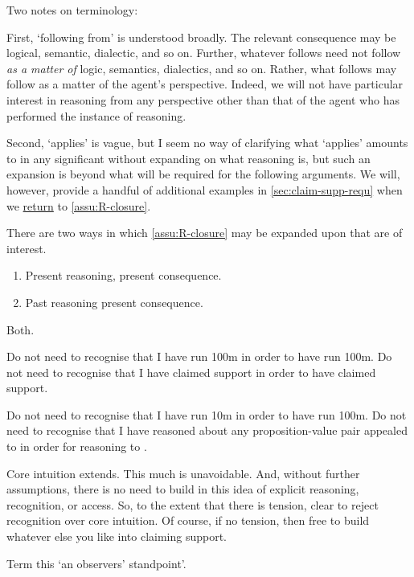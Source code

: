 \begin{note}
  Two notes on terminology:

  First, `following from' is understood broadly.
  The relevant consequence may be logical, semantic, dialectic, and so on.
  Further, whatever follows need not follow \emph{as a matter of} logic, semantics, dialectics, and so on.
  Rather, what follows may follow as a matter of the agent's perspective.
  Indeed, we will not have particular interest in reasoning from any perspective other than that of the agent who has performed the instance of reasoning.

  Second, `applies' is vague, but I seem no way of clarifying what `applies' amounts to in any significant without expanding on what reasoning is, but such an expansion is beyond what will be required for the following arguments.
  We will, however, provide a handful of additional examples in \autoref{sec:claim-supp-requ} when we \hyperref[independence-and-assu:R-closure]{return} to \autoref{assu:R-closure}.
\end{note}

\begin{note}
  There are two ways in which \autoref{assu:R-closure} may be expanded upon that are of interest.

  \begin{enumerate}
  \item Present reasoning, present consequence.
  \item Past reasoning present consequence.
  \end{enumerate}

  Both.
\end{note}

\begin{note}
  Do not need to recognise that I have run 100m in order to have run 100m.
  Do not need to recognise that I have claimed support in order to have claimed support.

  Do not need to recognise that I have run 10m in order to have run 100m.
  Do not need to recognise that I have reasoned about any proposition-value pair appealed to in order for reasoning to .

  Core intuition extends.
  This much is unavoidable.
  And, without further assumptions, there is no need to build in this idea of explicit reasoning, recognition, or access.
  So, to the extent that there is tension, clear to reject recognition over core intuition.
  Of course, if no tension, then free to build whatever else you like into claiming support.

  Term this `an observers' standpoint'.
\end{note}

